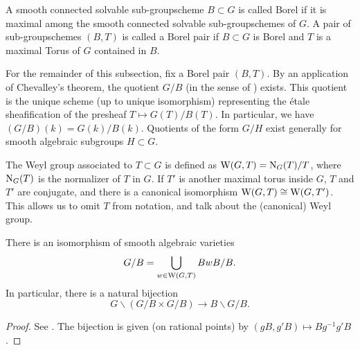 \documentclass[../main.tex]{subfiles}
\begin{document}
\begin{defi}\label{def:BorelSubgrp}
  A smooth connected solvable sub-groupscheme $B \subset G$ is called Borel if it 
  is maximal among the smooth connected solvable sub-groupschemes of $G$. 
  A pair of sub-groupschemes $(B,T)$ is called a Borel pair if $B \subset G$ is 
  Borel and $T$ is a maximal Torus of $G$ contained in $B$.
\end{defi}
For the remainder of this subsection, fix a Borel pair $(B,T)$. By an application
of Chevalley's theorem, the quotient $G/B$ (in the sense of \cite{milne2017algebraic})
exists. This quotient is the unique scheme (up to unique isomorphism) representing
the \'etale sheafification of the presheaf $T \mapsto G(T)/B(T)$. In particular,
we have $(G/B)(k) = G(k)/B(k)$. Quotients of the form $G/H$ exist generally for
smooth algebraic subgroups $H \subset G$. 
\begin{defi}\label{def:WeylGroup}
  The Weyl group associated to $T \subset G$ is defined as $\mathrm W(G,T) =
  \mathrm{N}_G(T)/T$, where $\mathrm{N}_G(T)$ is the normalizer of $T$ in $G$. 
  If $T'$ is another maximal torus inside $G$, $T$ and $T'$ are conjugate,
  and there is a canonical isomorphism $\mathrm W(G,T) \cong \mathrm W(G,T')$. 
  This allows us to omit $T$ from notation, and talk about the (canonical)
  Weyl group.
\end{defi}

\begin{thm}\label{thm:BruhatDecomposition}
  There is an isomorphism of smooth algebraic varieties
  \begin{equation*}
    G / B = \bigcup_{w \in \mathrm W(G,T)} B w B/B.
  \end{equation*}
  In particular, there is a natural bijection
  \begin{equation*}
    G \backslash ( G / B \times G / B ) \to B \backslash G / B.
  \end{equation*}
\begin{proof}
  See \cite[Section 20.h]{milne2017algebraic}. The bijection is given (on
  rational points) by $(gB, g'B) \mapsto  B g^{-1} g' B$. 
\end{proof}
\end{thm}




\end{document}
